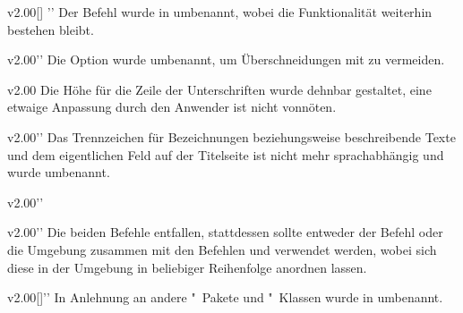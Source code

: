 \begin{Obsolete}{v2.00}{[]}%
  ''%
\printdeclarationlist%
%
Der Befehl  wurde in  umbenannt, wobei die 
Funktionalität weiterhin bestehen bleibt.
\end{Obsolete}

\begin{Obsolete}{v2.00}{}''
\printdeclarationlist%
%
Die Option wurde umbenannt, um Überschneidungen mit  zu 
vermeiden.
\end{Obsolete}

\begin{Obsolete}{v2.00}{}
\printdeclarationlist%
%
Die Höhe für die Zeile der Unterschriften wurde dehnbar gestaltet, eine etwaige 
Anpassung durch den Anwender ist nicht vonnöten.
\end{Obsolete}

\begin{Obsolete}{v2.00}{}''
\printdeclarationlist%
%
Das Trennzeichen für Bezeichnungen beziehungsweise beschreibende Texte und dem 
eigentlichen Feld auf der Titelseite ist nicht mehr sprachabhängig und wurde 
umbenannt.
\end{Obsolete}

\begin{Obsolete}{v2.00}{}''
\begin{Obsolete}{v2.00}{}''
\printdeclarationlist%
%
Die beiden Befehle entfallen, stattdessen sollte entweder der Befehl 
 oder die Umgebung  zusammen mit 
den Befehlen  und  verwendet werden, 
wobei sich diese in der Umgebung in beliebiger Reihenfolge anordnen lassen.
\end{Obsolete}
\end{Obsolete}

\begin{Obsolete}{v2.00}{[]}''
\printdeclarationlist%
%
In Anlehnung an andere "~Pakete und "~Klassen wurde 
 in  umbenannt.
\end{Obsolete}

